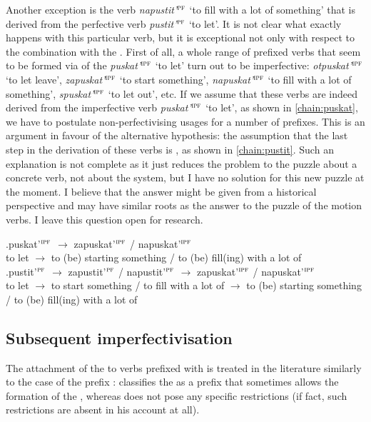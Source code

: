 Another exception is the verb \textit{napustit'}$^{\textsc{pf}}$ `to fill with a lot of something' that is derived from the perfective verb \textit{pustit'}$^{\textsc{pf}}$ `to let'. It is not clear what exactly happens with this particular verb, but it is exceptional not only with respect to the combination with the  . First of all, a whole range of prefixed verbs that seem to be formed via  of the  \textit{puskat'}$^{\textsc{ipf}}$ `to let' turn out to be imperfective: \textit{otpuskat'}$^{\textsc{ipf}}$ `to let leave', \textit{zapuskat'}$^{\textsc{ipf}}$ `to start something', \textit{napuskat'}$^{\textsc{ipf}}$ `to fill with a lot of something', \textit{spuskat'}$^{\textsc{ipf}}$ `to let out', etc. If we assume that these verbs are indeed derived from the imperfective verb \textit{puskat'}$^{\textsc{ipf}}$ `to let', as shown in \ref{chain:puskat}, we have to postulate non-perfectivising usages for a number of prefixes. This is an argument in favour of the alternative hypothesis: the assumption that the last step in the derivation of these verbs is , as shown in \ref{chain:pustit}. Such an explanation is not complete as it just reduces the problem to the puzzle about a concrete verb, not about the  system, but I have no solution for this new puzzle at the moment. I believe that the answer might be given from a historical perspective and may have similar roots as the answer to the puzzle of the motion verbs. I leave this question open for  research.

\exg.puskat'$^{\textsc{ipf}}$ $\rightarrow$ zapuskat'$^{\textsc{ipf}}$ / napuskat'$^{\textsc{ipf}}$ \label{chain:puskat}\\
{to let} $\rightarrow$ {to (be) starting something} / {to (be) fill(ing) with a lot of}\\

\exg.pustit'$^{\textsc{pf}}$ $\rightarrow$ zapustit'$^{\textsc{pf}}$ / napustit'$^{\textsc{pf}}$ $\rightarrow$ zapuskat'$^{\textsc{ipf}}$ / napuskat'$^{\textsc{ipf}}$ \label{chain:pustit}\\
{to let} $\rightarrow$ {to start something} / {to fill with a lot of} $\rightarrow$ {to (be) starting something} / {to (be) fill(ing) with a lot of}\\

\subsection{Subsequent imperfectivisation}
The attachment of the  to verbs prefixed with  is treated in the literature similarly to the case of the  prefix : \citet[230]{Svenonius:04b} classifies the   as a prefix that sometimes allows the formation of the , whereas \citet{Tatevosov:09} does not pose any specific restrictions (if fact, such restrictions are absent in his account at all).

